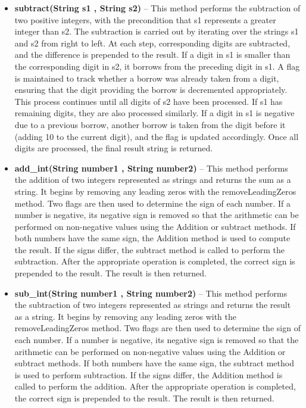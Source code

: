 \documentclass[a4paper,12pt]{article}
\begin{document}
\begin{itemize}
    \item \textbf{subtract(String s1 , String s2)} -- This method performs the subtraction of two positive integers, with the precondition that s1 represents a greater integer than s2. The subtraction is carried out by iterating over the strings s1 and s2 from right to left. At each step, corresponding digits are subtracted, and the difference is prepended to the result. If a digit in s1 is smaller than the corresponding digit in s2, it borrows from the preceding digit in s1. A flag is maintained to track whether a borrow was already taken from a digit, ensuring that the digit providing the borrow is decremented appropriately. This process continues until all digits of s2 have been processed. If s1 has remaining digits, they are also processed similarly. If a digit in s1 is negative due to a previous borrow, another borrow is taken from the digit before it (adding 10 to the current digit), and the flag is updated accordingly. Once all digits are processed, the final result string is returned.\\

    \item \textbf{add\_int(String number1 , String number2)} -- This method performs the addition of two integers represented as strings and returns the sum as a string. It begins by removing any leading zeros with the removeLeadingZeros method. Two flags are then used to determine the sign of each number. If a number is negative, its negative sign is removed so that the arithmetic can be performed on non-negative values using the Addition or subtract methods. If both numbers have the same sign, the Addition method is used to compute the result. If the signs differ, the subtract method is called to perform the subtraction. After the appropriate operation is completed, the correct sign is prepended to the result. The result is then returned.\\

    \item \textbf{sub\_int(String number1 , String number2)} -- This method performs the subtraction of two integers represented as strings and returns the result as a string. It begins by removing any leading zeros with the removeLeadingZeros method. Two flags are then used to determine the sign of each number. If a number is negative, its negative sign is removed so that the arithmetic can be performed on non-negative values using the Addition or subtract methods. If both numbers have the same sign, the subtract method is used to perform subtraction. If the signs differ, the Addition method is called to perform the addition. After the appropriate operation is completed, the correct sign is prepended to the result. The result is then returned.


\end{itemize}
\end{document}
